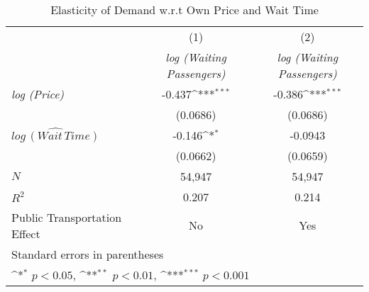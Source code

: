 \begin{table}[h]
\caption{Elasticity of Demand w.r.t Own Price and Wait Time}\label{tab:lnfare_regression}\\

{
\def\sym#1{\ifmmode^{#1}\else\(^{#1}\)\fi}
\begin{center}
\begin{tabular}{l*{2}{c}}
\hline\hline
            &\multicolumn{1}{c}{(1)}&\multicolumn{1}{c}{(2)}\\
            &\multicolumn{1}{c}{\textit{log (Waiting Passengers)}}&\multicolumn{1}{c}{\textit{log (Waiting Passengers)}}\\
\hline
\textit{log (Price)}      &      -0.437\sym{***}&      -0.386\sym{***}\\
            &    (0.0686)         &    (0.0686)         \\
[1em]
${\widehat{log\, (Wait\, Time)}}$&      -0.146\sym{*} &     -0.0943  \\
            &    (0.0662)         &    (0.0659)         \\
\hline
\(N\)       &       54,947         &       54,947         \\
\(R^{2}\)   &       0.207         &       0.214         \\
Public Transportation Effect &       No            &    Yes                 \\
\hline\hline
\multicolumn{3}{l}{\footnotesize Standard errors in parentheses}\\
\multicolumn{3}{l}{\footnotesize \sym{*} \(p<0.05\), \sym{**} \(p<0.01\), \sym{***} \(p<0.001\)}\\
\end{tabular}
\end{center}
}


\end{table}
